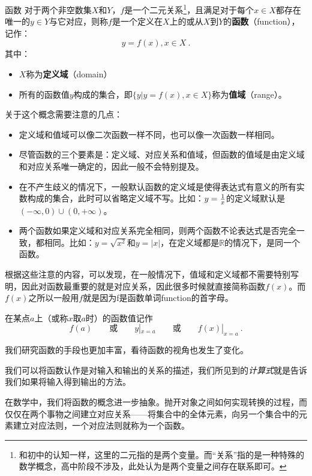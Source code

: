 \begin{definition}{函数}\label{def_functi_1}
对于两个非空数集$X$和$Y$，$f$是一个二元关系\footnote{和初中的认知一样，这里的二元指的是两个变量。而“关系”指的是一种特殊的数学概念，高中阶段不涉及，此处认为是两个变量之间存在联系即可。}，且满足对于每个$x\in X$都存在唯一的$y\in Y$与它对应，则称$f$是一个定义在$X$上的或从$X$到$Y$的\textbf{函数}（function），记作：
\begin{equation}
y=f(x),x\in X~.
\end{equation}
其中：
\begin{itemize}
\item $X$称为\textbf{定义域}（domain）
\item 所有的函数值$y$构成的集合，即$\{y|y=f(x),x\in X\}$称为\textbf{值域}（range）。
\end{itemize}
\end{definition}

关于这个概念需要注意的几点：
\begin{itemize}
\item 定义域和值域可以像二次函数一样不同，也可以像一次函数一样相同。
\item 尽管函数的三个要素是：定义域、对应关系和值域，但函数的值域是由定义域和对应关系唯一确定的，因此一般不会特别提及。
\item 在不产生歧义的情况下，一般默认函数的定义域是使得表达式有意义的所有实数构成的集合，此时可以省略定义域不写。比如：$y={1\over x}$的定义域默认是$(-\infty,0)\cup(0,+\infty)$。
\item 两个函数如果定义域和对应关系完全相同，则两个函数不论表达式是否完全一致，都相同。比如：$y=\sqrt{x^2}$和$y=|x|$，在定义域都是$\mathbb R$的情况下，是同一个函数。
\end{itemize}

根据这些注意的内容，可以发现，在一般情况下，值域和定义域都不需要特别写明，因此对函数最重要的就是对应关系，因此很多时候就直接简称函数$f(x)$。而$f(x)$之所以一般用$f$就是因为f是函数单词function的首字母。

在某点$a$上（或称$x$取$a$时）的函数值记作
\begin{equation}
f(a)\qquad\text{或}\qquad y|_{x=a}\qquad\text{或}\qquad f(x)|_{x=a}~.
\end{equation}

我们研究函数的手段也更加丰富，看待函数的视角也发生了变化。

我们可以将函数认作是对输入和输出的关系的描述，我们所见到的\textsl{计算式}就是告诉我们如果将输入得到输出的方法。

在数学中，我们将函数的概念进一步抽象。抛开对象之间如何实现转换的过程，而仅仅在两个事物之间建立对应关系——将集合中的全体元素，向另一个集合中的元素建立对应法则，一个对应法则就称为一个函数。

